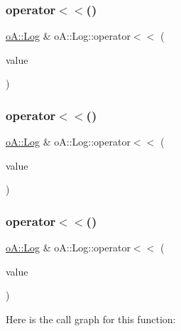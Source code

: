 \subsubsection{\texorpdfstring{operator$<$$<$()}{operator<<()}\hspace{0.1cm}{\footnotesize\ttfamily [4/9]}}
{\footnotesize\ttfamily \mbox{\hyperlink{classo_a_1_1_log}{o\+A\+::\+Log}} \& o\+A\+::\+Log\+::operator$<$$<$ (\begin{DoxyParamCaption}\item[{char}]{value }\end{DoxyParamCaption})}

\mbox{\label{classo_a_1_1_log_a151d996709b215055998475e5610ea2c}} 
\subsubsection{\texorpdfstring{operator$<$$<$()}{operator<<()}\hspace{0.1cm}{\footnotesize\ttfamily [5/9]}}
{\footnotesize\ttfamily \mbox{\hyperlink{classo_a_1_1_log}{o\+A\+::\+Log}} \& o\+A\+::\+Log\+::operator$<$$<$ (\begin{DoxyParamCaption}\item[{bool}]{value }\end{DoxyParamCaption})}

\mbox{\label{classo_a_1_1_log_a206fea477101843b2eb9cbc71ebd34cd}} 
\subsubsection{\texorpdfstring{operator$<$$<$()}{operator<<()}\hspace{0.1cm}{\footnotesize\ttfamily [6/9]}}
{\footnotesize\ttfamily \mbox{\hyperlink{classo_a_1_1_log}{o\+A\+::\+Log}} \& o\+A\+::\+Log\+::operator$<$$<$ (\begin{DoxyParamCaption}\item[{\mbox{\hyperlink{namespaceo_a_ab34d92c907da3ac86211277a1341c6c2}{o\+A\+::\+Long}}}]{value }\end{DoxyParamCaption})}

Here is the call graph for this function\+:
\mbox{\label{classo_a_1_1_log_a59165364886174ee41ef0addd123b216}} 
